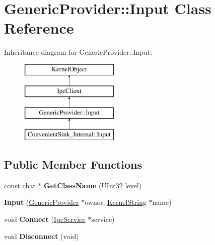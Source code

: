 \hypertarget{class_generic_provider_1_1_input}{}\section{Generic\+Provider\+:\+:Input Class Reference}
\label{class_generic_provider_1_1_input}
Inheritance diagram for Generic\+Provider\+:\+:Input\+:\begin{figure}[H]
\begin{center}
\leavevmode
\includegraphics[height=4.000000cm]{class_generic_provider_1_1_input}
\end{center}
\end{figure}
\subsection*{Public Member Functions}
\begin{DoxyCompactItemize}
\item 
\mbox{\label{class_generic_provider_1_1_input_ada4c804a620739200b092c515de715cf}} 
const char $\ast$ {\bfseries Get\+Class\+Name} (U\+Int32 level)
\item 
\mbox{\label{class_generic_provider_1_1_input_ad57336e411b51000ab32aa6f20278b60}} 
{\bfseries Input} (\hyperlink{class_generic_provider}{Generic\+Provider} $\ast$owner, \hyperlink{class_kernel_string}{Kernel\+String} $\ast$name)
\item 
\mbox{\label{class_generic_provider_1_1_input_a972ad0d779ab00ba19e05258b690ef07}} 
void {\bfseries Connect} (\hyperlink{class_ipc_service}{Ipc\+Service} $\ast$service)
\item 
\mbox{\label{class_generic_provider_1_1_input_a1c7cd203e8ab72138e7b45270955ccb5}} 
void {\bfseries Disconnect} (void)
\end{DoxyCompactItemize}
